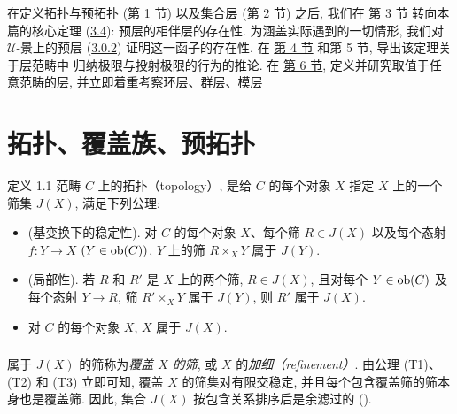 在\pageoriginale{}定义拓扑与预拓扑 (\hyperref[II.sec1]{第 1 节})
以及集合层 (\hyperref[II.sec2]{第 2 节}) 之后,
我们在 \hyperref[II.sec3]{第 3 节} 转向本篇的核心定理
(\hyperref[II.theo3.4]{3.4}): 预层的相伴层的存在性.
为涵盖实际遇到的一切情形, 我们对 $𝒰$-景上的预层
(\hyperref[II.def3.0.2]{3.0.2}) 证明这一函子的存在性.
在 \hyperref[II.sec4]{第 4 节} 和第 5 节, 导出该定理关于层范畴中
归纳极限与投射极限的行为的推论.
在 \hyperref[II.sec6]{第 6 节}, 定义并研究取值于任意范畴的层,
并立即着重考察环层、群层、模层\etcn

\section{拓扑、覆盖族、预拓扑}

\begin{enonce*}{定义 1.1}
范畴 $C$ 上的拓扑（topology）, 是给 $C$ 的每个对象 $X$
指定 $X$ 上的一个筛集 $J(X)$, 满足下列公理:
\begin{itemize}
\item[T 1)] {\rm{(基变换下的稳定性).}}
对 $C$ 的每个对象 $X$、每个筛 $R\in J(X)$
以及每个态射 $f:Y\rightarrow X$ $(Y\in \operatorname{ob} (C))$,
$Y$ 上的筛 $R\times_X Y$ 属于 $J(Y)$.

\item[T 2)] {\rm(局部性).} 若 $R$ 和 $R'$ 是 $X$ 上的两个筛,
$R\in J(X)$, 且对每个 $Y\in \operatorname{ob} (C)$ 及每个态射 $Y\rightarrow R$,
筛 $R'\times_X Y$ 属于\pageoriginale{} $J(Y)$,
则 $R'$ 属于 $J(X)$.

\item[T 3)] 对 $C$ 的每个对象 $X$, $X$ 属于 $J(X)$.
\end{itemize}
\end{enonce*}

\setcounter{subsection}{1}
\subsubsection{}

属于 $J(X)$ 的筛称为\emph{覆盖 $X$ 的筛},
或 $X$ 的\emph{加细（refinement）}.
由公理 (T1)、(T2) 和 (T3) 立即可知,
覆盖 $X$ 的筛集对有限交稳定,
并且每个包含覆盖筛的筛本身也是覆盖筛.
因此, 集合 $J(X)$ 按包含关系排序后是余滤过的
().

\subsubsection{}

